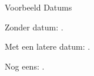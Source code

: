 \documentclass[12pt,dutch]{article}
\begin{document}
    \begin{center}
        \Huge Voorbeeld Datums
    \end{center}

    \label{art:datums}
    \begin{paras}
        \item Zonder datum: .
        \item Met een latere datum: .
        \item Nog eens: .
    \end{paras}
\end{document}
